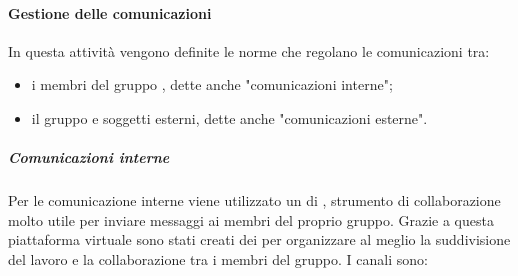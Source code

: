 \paragraph{Gestione delle comunicazioni}

In questa attività vengono definite le norme che regolano le comunicazioni tra:
\begin{itemize}
	\item i membri del gruppo \Gruppo{}, dette anche "comunicazioni interne";
	\item il gruppo e soggetti esterni, dette anche "comunicazioni esterne".
\end{itemize}

\subparagraph*{Comunicazioni interne}
Per le comunicazione interne viene utilizzato un  di , strumento di collaborazione molto utile per inviare messaggi ai membri del proprio gruppo.
Grazie a questa piattaforma virtuale sono stati creati dei  per organizzare al meglio la suddivisione del lavoro e la collaborazione tra i membri del gruppo.
I canali sono:
